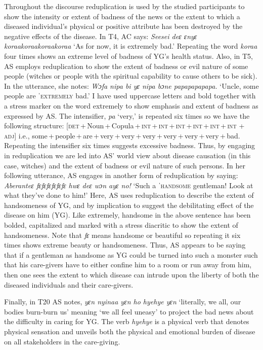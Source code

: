 \documentclass[output=paper,colorlinks,citecolor=brown]{langscibook}
\begin{document}
Throughout the discourse reduplication is used by the studied participants to show the intensity or extent of badness of the news or the extent to which a diseased individual’s physical or positive attribute has been destroyed by the negative effects of the disease. In T4, AC says: \textit{Seesei deɛ ɛnyɛ koraakoraakoraakoraa} ‘As for now, it is extremely bad.’ Repeating the word \textit{koraa} four times shows an extreme level of badness of YG’s health status. Also, in T5, AS employs reduplication to show the extent of badness or evil nature of some people (witches or people with the spiritual capability to cause others to be sick). In the utterance, she notes: \textit{Wɔfa nipa bi yɛ nipa bɔne papapapapapa.} ‘Uncle, some people are ˈ\textsc{extremely} bad.’ I have used uppercase letters and bold together with a stress marker on the word extremely to show emphasis and extent of badness as expressed by AS. The intensifier, \textit{pa} ‘very,’ is repeated six times so we have the following structure: [\textsc{det}\,+\,Noun\,+\,Copula\,+\,\textsc{int}\,+\,\textsc{int}\,+\,\textsc{int}\,+\,\textsc{int}\,+\,\textsc{int}\,+\,\textsc{int} + \textsc{adj}] i.e., some\,+\,people\,+\,are\,+\,very\,+\,very\,+\,very\,+\,very\,+\,very\,+\,very\,+\,bad. Repeating the intensifier six times suggests excessive badness. Thus, by engaging in reduplication we are led into AS’ world view about disease causation (in this case, witches) and the extent of badness or evil nature of such persons. In her following utterance, AS engages in another form of reduplication by saying: \textit{Aberanteɛ fɛfɛfɛfɛfɛfɛ hwɛ deɛ wɔn ayɛ no!} ‘Such a ˈ\textsc{handsome} gentleman! Look at what they’ve done to him!’ Here, AS uses reduplication to describe the extent of handsomeness of YG, and by implication to suggest the debilitating effect of the disease on him (YG). Like extremely, handsome in the above sentence has been bolded, capitalized and marked with a stress diacritic to show the extent of handsomeness. Note that \textit{fɛ} means handsome or beautiful so repeating it six times shows extreme beauty or handsomeness. Thus, AS appears to be saying that if a gentleman as handsome as YG could be turned into such a monster such that his care-givers have to either confine him to a room or run away from him, then one sees the extent to which disease can intrude upon the liberty of both the diseased individuals and their care-givers.

Finally, in T20 AS notes, \textit{yɛn nyinaa yɛn ho hyehye yɛn} ‘literally, we all, our bodies burn-burn us’ meaning ‘we all feel uneasy’ to project the bad news about the difficulty in caring for YG. The verb \textit{hyehye} is a physical verb that denotes physical sensation and unveils both the physical and emotional burden of disease on all stakeholders in the care-giving.
\end{document}
